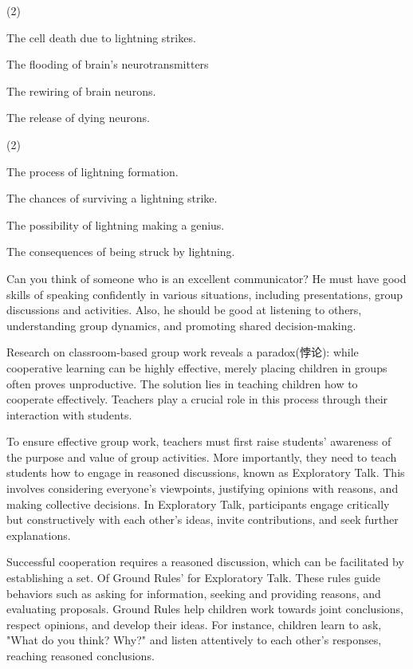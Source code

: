 \documentclass{英语试卷}
\begin{document}
\begin{choices}(2)
  \item The cell death due to lightning strikes.
  \item The flooding of brain's neurotransmitters
  \item The rewiring of brain neurons.
  \item The release of dying neurons.
\end{choices}
\begin{choices}(2)
  \item The process of lightning formation.
  \item The chances of surviving a lightning strike.
  \item The possibility of lightning making a genius.
  \item The consequences of being struck by lightning.
\end{choices}
\par Can you think of someone who is an excellent communicator? He must have good skills of speaking confidently in various situations, including presentations, group discussions and activities. Also, he should be good at listening to others, understanding group dynamics, and promoting shared decision-making.\par
\par Research on classroom-based group work reveals a paradox(悖论): while cooperative learning can be highly effective, merely placing children in groups often proves unproductive. The solution lies in teaching children how to cooperate effectively. Teachers play a crucial role in this process through their interaction with students.\par
\par To ensure effective group work, teachers must first raise students' awareness of the purpose and value of group activities. More importantly, they need to teach students how to engage in reasoned discussions, known as Exploratory Talk. This involves considering everyone's viewpoints, justifying opinions with reasons, and making collective decisions. In Exploratory Talk, participants engage critically but constructively with each other's ideas, invite contributions, and seek further explanations.\par
\par Successful cooperation requires a reasoned discussion, which can be facilitated by establishing a set. Of Ground Rules' for Exploratory Talk. These rules guide behaviors such as asking for information, seeking and providing reasons, and evaluating proposals. Ground Rules help children work towards joint conclusions, respect opinions, and develop their ideas. For instance, children learn to ask, "What do you think? Why?" and listen attentively to each other's responses, reaching reasoned conclusions.\par
\end{document}
